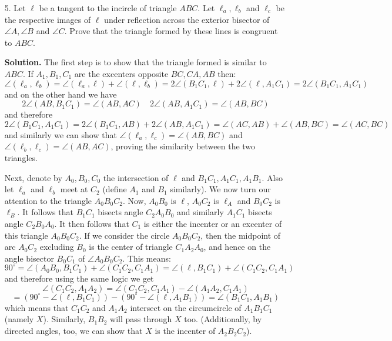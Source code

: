 \documentclass[11pt,a4paper]{article}
\begin{document}
\begin{enumerate}
	\item[5.] Let $\ell$ be a tangent to the incircle of triangle $ABC$. Let $\ell_a,\ell_b$ and $\ell_c$ be the respective images of $\ell$ under reflection across the exterior bisector of $\angle A,\angle  B$ and $\angle C$. Prove that the triangle formed by these lines is congruent to $ABC$.
	
	\textbf{Solution.} The first step is to show that the triangle formed is similar to $ABC$. If $A_1, B_1, C_1$ are the excenters opposite $BC, CA, AB$ then: 
	\[
	\angle(\ell_a, \ell_b) = \angle(\ell_a, \ell)+\angle(\ell, \ell_b) = 2\angle(B_1C_1, \ell)+2\angle(\ell, A_1C_1) = 2\angle(B_1C_1, A_1C_1)
	\]
	and on the other hand we have 
	\[
	2\angle(AB, B_1C_1) = \angle(AB, AC)\quad 2\angle(AB, A_1C_1) = \angle(AB, BC)
	\]
	and therefore 
	\[
	2\angle(B_1C_1, A_1C_1) = 2\angle(B_1C_1, AB) + 2\angle(AB, A_1C_1) = \angle(AC, AB) + \angle(AB, BC) = 
	\angle(AC, BC)
	\]
	and similarly we can show that $\angle(\ell_a, \ell_c)= \angle(AB, BC)$ and $\angle(\ell_b, \ell_c) = \angle(AB, AC)$, proving the similarity between the two triangles. 
	
	Next, denote by $A_0, B_0, C_0$ the intersection of $\ell$ and $B_1C_1, A_1C_1, A_1B_1$. Also let $\ell_a$ and $\ell_b$ meet at $C_2$ (define $A_1$ and $B_1$ similarly). 
	We now turn our attention to the triangle $A_0B_0C_2$. Now, $A_0B_0$ is $\ell$, $A_0C_2$ is $\ell_A$ and $B_0C_2$ is $\ell_B$. It follows that $B_1C_1$ bisects angle $C_2A_0B_0$ and similarly $A_1C_1$ bisects angle $C_2B_0A_0$. It then follows that $C_1$ is either the incenter or an excenter of this triangle $A_0B_0C_2$. 
	If we consider the circle $A_0B_0C_2$, then the midpoint of arc $A_0C_2$ excluding $B_0$ is the center of triangle $C_1A_2A_0$, and hence on the angle bisector $B_0C_1$ of $\angle A_0B_0C_2$. 
	This means: 
	\[
	90^{\circ} = \angle(A_0B_0, B_1C_1) + \angle(C_1C_2, C_1A_1) = \angle(\ell, B_1C_1) + \angle(C_1C_2, C_1A_1)
	\] 
	and therefore using the same logic we get
	\[
	\angle(C_1C_2, A_1A_2) = \angle(C_1C_2, C_1A_1) - \angle(A_1A_2, C_1A_1) 
	\]\[
	= (90^{\circ} - \angle(\ell, B_1C_1))- (90^{\circ} - \angle(\ell, A_1B_1)) = \angle(B_1C_1, A_1B_1)
	\]
	which means that $C_1C_2$ and $A_1A_2$ intersect on the circumcircle of $A_1B_1C_1$ (namely $X$). Similarly, $B_1B_2$ will pass through $X$ too. (Additionally, by directed angles, too, we can show that $X$ is the incenter of $A_2B_2C_2$). 
	

\end{enumerate}
\end{document}
